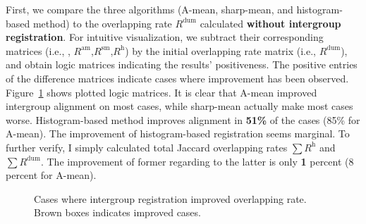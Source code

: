 \documentclass[preprint,review,12pt]{elsarticle}
\newcommand{\ie}{{i.e., }}
\newcommand{\OverlapMatSharpMean}{R^{\text{sm}}}
\newcommand{\OverlapMatMean}{R^{\text{am}}}
\newcommand{\OverlapMatHistogram}{R^{\text{h}}}
\newcommand{\OverlapMatDummy}{R^{\text{dum}}}
\begin{document}
First, we compare the three algorithms (A-mean, sharp-mean, and histogram-based method) to the overlapping rate $\OverlapMatDummy$ calculated {\bf without intergroup registration}. For intuitive visualization, we subtract their corresponding matrices (\ie, $\OverlapMatMean$,$\OverlapMatSharpMean$,$\OverlapMatHistogram$) by the initial overlapping rate matrix (\ie $\OverlapMatDummy$), and obtain logic matrices indicating the results' positiveness. The positive entries of the difference matrices indicate cases where improvement has been observed. Figure~\ref{fig:relative} shows plotted logic matrices. It is clear that A-mean improved intergroup alignment on most cases, while sharp-mean actually make most cases worse. Histogram-based method improves alignment in {\bf 51\%} of the cases (85\% for A-mean). The improvement of histogram-based registration seems marginal. To further verify, I simply calculated total Jaccard overlapping rates $\sum \OverlapMatHistogram$  and $\sum \OverlapMatDummy$. The improvement of former regarding to the latter is only {\bf 1} percent (8 percent for A-mean).

\begin{figure}
\caption{Cases where intergroup registration improved overlapping rate. Brown boxes indicates improved cases.}
\label{fig:relative}
\end{figure}
\end{document}
